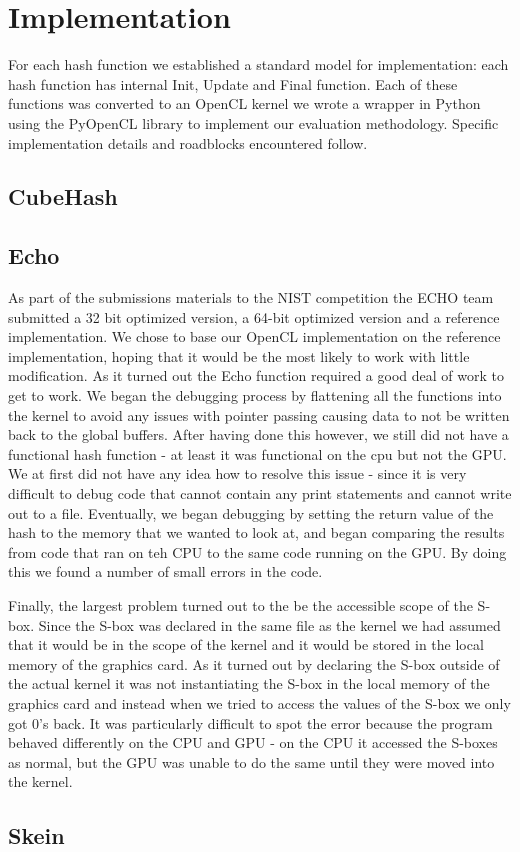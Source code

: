 \section*{Implementation}

For each hash function we established a standard model for implementation: each hash function has internal Init, Update and Final function.
Each of these functions was converted to an OpenCL kernel we wrote a wrapper in Python using the PyOpenCL library to implement our evaluation methodology.  Specific implementation details and roadblocks encountered follow.

\subsection*{CubeHash}

\subsection*{Echo}

As part of the submissions materials to the NIST competition the ECHO team submitted a 32 bit optimized version, a 64-bit optimized version and a reference implementation.  
We chose to base our OpenCL implementation on the reference implementation, hoping that it would be the most likely to work with little modification.
As it turned out the Echo function required a good deal of work to get to work.
We began the debugging process by flattening all the functions into the kernel to avoid any issues with pointer passing causing data to not be written back to the global buffers.
After having done this however, we still did not have a functional hash function - at least it was functional on the cpu but not the GPU.  
We at first did not have any idea how to resolve this issue - since it is very difficult to debug code that cannot contain any print statements and cannot write out to a file. 
Eventually, we began debugging by setting the return value of the hash to the memory that we wanted to look at, and began comparing the results from code that ran on teh CPU to the same code running on the GPU.
By doing this we found a number of small errors in the code.

Finally, the largest problem turned out to the be the accessible scope of the S-box.
Since the S-box was declared in the same file as the kernel we had assumed that it would be in the scope of the kernel and it would be stored in the local memory of the graphics card.
As it turned out by declaring the S-box outside of the actual kernel it was not instantiating the S-box in the local memory of the graphics card and instead when we tried to access the values of the S-box we only got 0's back.
It was particularly difficult to spot the error because the program behaved differently on the CPU and GPU - on the CPU it accessed the S-boxes as normal, but the GPU was unable to do the same until they were moved into the kernel.
\subsection*{Skein}

